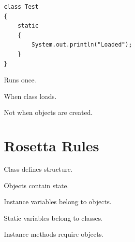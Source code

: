 \documentclass[11pt,a4paper]{book}
\begin{document}
\begin{verbatim}
class Test
{
    static
    {
        System.out.println("Loaded");
    }
}
\end{verbatim}


Runs once.


When class loads.


Not when objects are created.


\section{Rosetta Rules}

\begin{rosettarule}

Class defines structure.

\end{rosettarule}


\begin{rosettarule}

Objects contain state.

\end{rosettarule}


\begin{rosettarule}

Instance variables belong to objects.

\end{rosettarule}


\begin{rosettarule}

Static variables belong to classes.

\end{rosettarule}


\begin{rosettarule}

Instance methods require objects.

\end{rosettarule}
\end{document}
